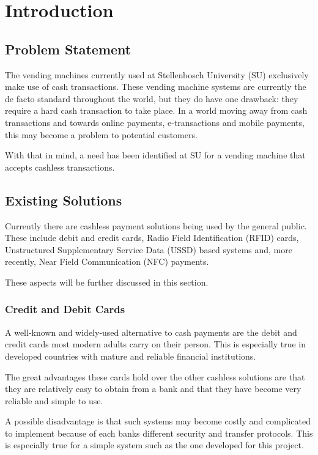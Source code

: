 \chapter{Introduction}
\label{chap:1}

\section{Problem Statement}

The vending machines currently used at Stellenbosch University (SU) exclusively
make use of cash transactions. These vending machine systems are currently the
de facto standard throughout the world, but they do have one drawback:
they require a hard cash transaction to take place. In a world moving away from
cash transactions and towards online payments, e-transactions and mobile
payments, this may become a problem to potential customers.

With that in mind, a need has been identified at SU for a vending machine that accepts
cashless transactions.

\section{Existing Solutions}

Currently there are cashless payment solutions being used by the general public.
These include debit and credit cards, Radio Field Identification (RFID) cards,
Unstructured Supplementary Service Data (USSD) based systems and, more recently, Near
Field Communication (NFC) payments.

These aspects will be further discussed in this section.

\subsection{Credit and Debit Cards}

A well-known and widely-used alternative to cash payments are the debit and
credit cards most modern adults carry on their person. This is especially
true in developed countries with mature and reliable financial institutions.

The great advantages these cards hold over the other cashless solutions are
that they are relatively easy to obtain from a bank and that they have become very
reliable and simple to use.

A possible disadvantage is that such systems may become costly and complicated to implement
because of each banks different security and transfer protocols. This is especially true
for a simple system such as the one developed for this project.

